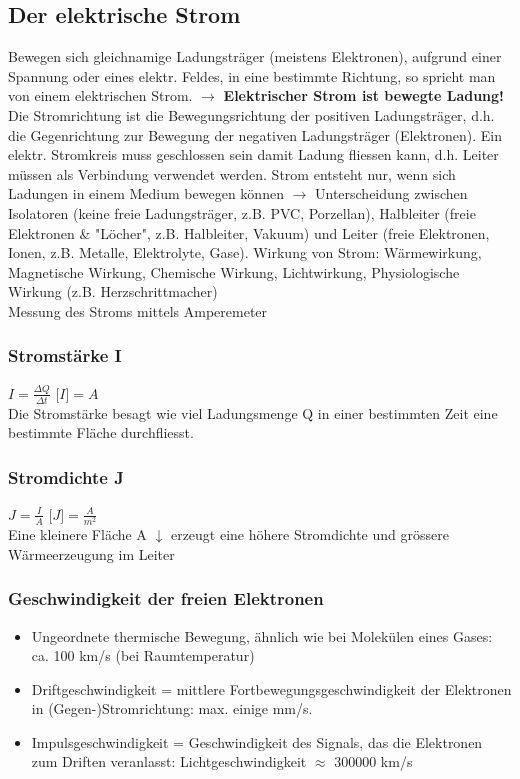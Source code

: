 \subsection{Der elektrische Strom}
Bewegen sich gleichnamige Ladungsträger (meistens Elektronen), aufgrund einer Spannung oder eines elektr. Feldes, in eine bestimmte Richtung, so spricht man von einem elektrischen Strom.
$\rightarrow$ \textbf{Elektrischer Strom ist bewegte Ladung!}\\
Die Stromrichtung ist die Bewegungsrichtung der positiven Ladungsträger, d.h. die Gegenrichtung zur Bewegung der negativen Ladungsträger (Elektronen). Ein elektr. Stromkreis muss geschlossen sein damit Ladung fliessen kann, d.h. Leiter müssen als Verbindung verwendet werden. Strom entsteht nur, wenn sich Ladungen in einem Medium bewegen können $\rightarrow$ Unterscheidung zwischen Isolatoren (keine freie Ladungsträger, z.B. PVC, Porzellan), Halbleiter (freie Elektronen \& "Löcher", z.B. Halbleiter, Vakuum) und Leiter (freie Elektronen, Ionen, z.B. Metalle, Elektrolyte, Gase). Wirkung von Strom: Wärmewirkung, Magnetische Wirkung, Chemische Wirkung, Lichtwirkung, Physiologische Wirkung (z.B. Herzschrittmacher) \\ Messung des Stroms mittels Amperemeter\\
\begin{multicols}{2}
	\subsubsection{Stromstärke I}
	$ I=\frac{\Delta Q}{\Delta t}$ \hspace{10pt}  $\lbrack I \rbrack = A $\\
	Die Stromstärke besagt wie viel Ladungsmenge Q in einer bestimmten Zeit eine bestimmte Fläche durchfliesst. 
	\subsubsection{Stromdichte J}
	$ J=\frac {I}{A}$  \hspace{10pt}  $\lbrack J \rbrack = \frac {A}{m^2} $\\
	Eine kleinere Fläche A $\downarrow$ erzeugt eine höhere Stromdichte und grössere Wärmeerzeugung im Leiter
\end{multicols}
\subsubsection{Geschwindigkeit der freien Elektronen}
\begin{itemize}
	\item Ungeordnete thermische Bewegung, ähnlich wie bei Molekülen eines Gases: ca. 100 km/s (bei Raumtemperatur)\\
	\item Driftgeschwindigkeit = mittlere Fortbewegungsgeschwindigkeit der Elektronen in  (Gegen-)Stromrichtung: max. einige mm/s.\\
	\item Impulsgeschwindigkeit = Geschwindigkeit des Signals, das die Elektronen zum Driften veranlasst: Lichtgeschwindigkeit $\approx$ 300000 km/s\\
\end{itemize}

